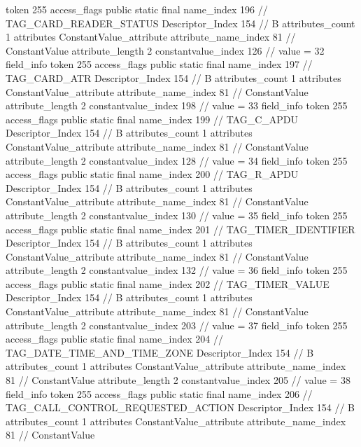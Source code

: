 {{{{{				token	255
				access_flags	public static final
				name_index	196		// TAG_CARD_READER_STATUS
				Descriptor_Index	154		// B
				attributes_count	1
				attributes {
				ConstantValue_attribute {
					attribute_name_index	81		// ConstantValue
					attribute_length	2
					constantvalue_index	126		// value = 32
				}
				}
			}
			field_info {
				token	255
				access_flags	public static final
				name_index	197		// TAG_CARD_ATR
				Descriptor_Index	154		// B
				attributes_count	1
				attributes {
				ConstantValue_attribute {
					attribute_name_index	81		// ConstantValue
					attribute_length	2
					constantvalue_index	198		// value = 33
				}
				}
			}
			field_info {
				token	255
				access_flags	public static final
				name_index	199		// TAG_C_APDU
				Descriptor_Index	154		// B
				attributes_count	1
				attributes {
				ConstantValue_attribute {
					attribute_name_index	81		// ConstantValue
					attribute_length	2
					constantvalue_index	128		// value = 34
				}
				}
			}
			field_info {
				token	255
				access_flags	public static final
				name_index	200		// TAG_R_APDU
				Descriptor_Index	154		// B
				attributes_count	1
				attributes {
				ConstantValue_attribute {
					attribute_name_index	81		// ConstantValue
					attribute_length	2
					constantvalue_index	130		// value = 35
				}
				}
			}
			field_info {
				token	255
				access_flags	public static final
				name_index	201		// TAG_TIMER_IDENTIFIER
				Descriptor_Index	154		// B
				attributes_count	1
				attributes {
				ConstantValue_attribute {
					attribute_name_index	81		// ConstantValue
					attribute_length	2
					constantvalue_index	132		// value = 36
				}
				}
			}
			field_info {
				token	255
				access_flags	public static final
				name_index	202		// TAG_TIMER_VALUE
				Descriptor_Index	154		// B
				attributes_count	1
				attributes {
				ConstantValue_attribute {
					attribute_name_index	81		// ConstantValue
					attribute_length	2
					constantvalue_index	203		// value = 37
				}
				}
			}
			field_info {
				token	255
				access_flags	public static final
				name_index	204		// TAG_DATE_TIME_AND_TIME_ZONE
				Descriptor_Index	154		// B
				attributes_count	1
				attributes {
				ConstantValue_attribute {
					attribute_name_index	81		// ConstantValue
					attribute_length	2
					constantvalue_index	205		// value = 38
				}
				}
			}
			field_info {
				token	255
				access_flags	public static final
				name_index	206		// TAG_CALL_CONTROL_REQUESTED_ACTION
				Descriptor_Index	154		// B
				attributes_count	1
				attributes {
				ConstantValue_attribute {
					attribute_name_index	81		// ConstantValue
}}}}}}}

